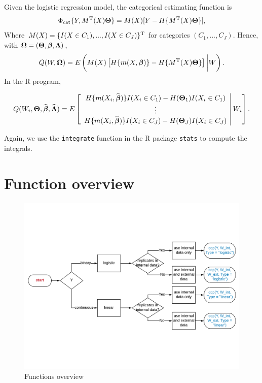 \documentclass[15 pt,]{article}
\begin{document}
Given the logistic regression model, the categorical estimating function
is \[
                \Phi_{\rm cat}\{Y,M^{\rm T}(X)\mbox{\boldmath $\Theta$}\} = M(X) [Y - H\{M^{\rm T}(X)\mbox{\boldmath $\Theta$}\}],
\] Where \(M(X) = \{ I(X\in C_1),..., I(X\in C_J)\}^{\rm T}\) for
categories \((C_1, ..., C_J)\). Hence, with
\(\mbox{\boldmath $\Omega$} = (\mbox{\boldmath $\Theta$},\mbox{\boldmath $\beta$},\mbox{\boldmath $\Lambda$})\), \[
                Q(W,\mbox{\boldmath $\Omega$}) = E\left( M(X) \left[H\{m(X, \mbox{\boldmath $\beta$})\} - H\{M^{\rm T} (X)\mbox{\boldmath $\Theta$}\}\right]\bigg\vert W\right).
                \] In the R program,

\begin{equation*}
Q(W_i,\bTheta, \wh\bbeta,\wh\bLambda)  =  E \left[\begin{array}{c}
H\{m(X_i, \wh\bbeta)\} I(X_i \in C_1) - H(\bTheta_1) I(X_i \in C_1) \\
\vdots \\
H\{m(X_i, \wh\bbeta)\} I(X_i \in C_J) - H(\bTheta_J) I(X_i \in C_J)
\end{array} \vline \hbox{ } W_i \right].
\end{equation*}

Again, we use the \texttt{integrate} function in the R package
\texttt{stats} to compute the integrals.

\section{Function overview}\label{function-overview}

\begin{figure}

{\centering \includegraphics[width=0.95\linewidth]{CCP} 

}

\caption{Functions overview}\label{fig:unnamed-chunk-1}
\end{figure}
\end{document}

